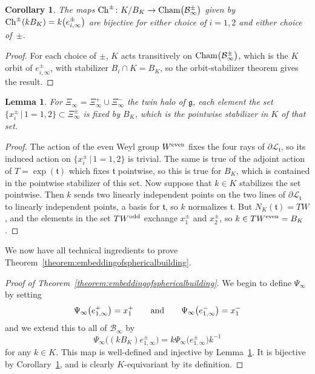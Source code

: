 \documentclass[pdftex]{sigma}
\numberwithin{equation}{section}
\newtheorem{Corollary}[Theorem]{Corollary}
\newtheorem{Lemma}[Theorem]{Lemma}
\def\cB{\mathcal B}
\def\cL{\mathcal L}
\def\fg{\mathfrak{g}}
\def\ft{\mathfrak{t}}
\begin{document}
\begin{Corollary}\label{lemma:K-orbit} The maps ${\rm Ch}^\pm\colon K/B_K \to {\rm Cham}\big(\cB_{\infty}^\pm\big)$ given by ${\rm Ch}^\pm(kB_K) = k\big(e_{i,\infty}^\pm\big)$ are bijective for either choice of $i=1,2$ and either choice of~$\pm$.
\end{Corollary}

\begin{proof}For each choice of $\pm$, $K$ acts transitively on ${\rm Cham}\big(\cB_{\infty}^\pm\big)$, which is the $K$ orbit of $e_{i,\infty}^\pm$, with stabilizer $B_i\cap K = B_K$, so the orbit-stabilizer theorem gives the result.
\end{proof}

\begin{Lemma}\label{lemma:stabilizer} For $\Xi_\infty = \Xi_\infty^+ \cup \Xi_\infty^-$ the twin halo of $\fg$, each element the set $\big\{x^\pm_i\, |\, 1=1,2\big\}\subset\Xi_\infty^\pm$ is fixed by $B_K$, which is the pointwise stabilizer in $K$ of that set.
\end{Lemma}

\begin{proof}The action of the even Weyl group $W^{\rm even}$ fixes the four rays of $\partial\cL_\ft$, so its induced action on $\big\{x^\pm_i\, |\, 1=1,2\big\}$ is trivial. The same is true of the adjoint action of $T=\exp(\ft)$ which fixes $\ft$ pointwise, so this is true for $B_K$, which is contained in the pointwise stabilizer of this set. Now suppose that $k\in K$ stabilizes the set pointwise. Then $k$ sends two linearly independent points on the two lines of $\partial\cL_\ft$ to linearly independent points, a basis for $\ft$, so $k$ normalizes $\ft$. But $N_K(\ft) = TW$, and the elements in the set $TW^{\rm odd}$ exchange $x^\pm_1$ and $x^\pm_2$, so $k\in TW^{\rm even} = B_K$.
\end{proof}

We now have all technical ingredients to prove Theorem~\ref{theorem:embeddingofsphericalbuilding}.

\begin{proof}[Proof of Theorem~\ref{theorem:embeddingofsphericalbuilding}]
We begin to define $\Psi_\infty$ by setting
\[\Psi_\infty\big(e_{1,\infty}^+\big) = x_1^+ \qquad\hbox{and}\qquad
\Psi_\infty\big(e_{1,\infty}^-\big) = x_1^-\]
and we extend this to all of $\cB_\infty$ by
\[\Psi_\infty\big((kB_K)e_{1,\infty}^\pm\big) = k \Psi_\infty\big(e_{1,\infty}^\pm\big) k^{-1}\]
for any $k\in K$. This map is well-defined and injective by Lemma~\ref{lemma:stabilizer}.
It is bijective by Corollary~\ref{lemma:K-orbit}, and is clearly $K$-equivariant by its definition.
\end{proof}
\end{document}
